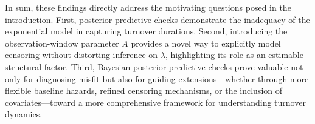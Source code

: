 In sum, these findings directly address the motivating questions posed in the introduction. First, posterior predictive checks demonstrate the inadequacy of the exponential model in capturing turnover durations. Second, introducing the observation-window parameter $A$ provides a novel way to explicitly model censoring without distorting inference on $\lambda$, highlighting its role as an estimable structural factor. Third, Bayesian posterior predictive checks prove valuable not only for diagnosing misfit but also for guiding extensions—whether through more flexible baseline hazards, refined censoring mechanisms, or the inclusion of covariates—toward a more comprehensive framework for understanding turnover dynamics.